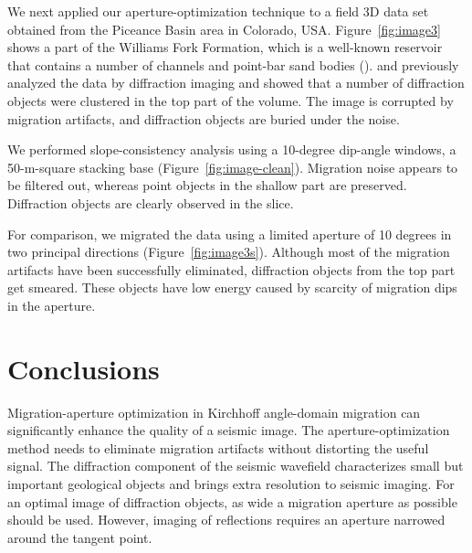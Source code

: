 We next applied our aperture-optimization technique to a field 3D data set obtained from the Piceance Basin area in Colorado, USA.
Figure~\ref{fig:image3} shows a part of the Williams Fork Formation, which is a well-known reservoir that
contains a number of channels and point-bar sand bodies (\citealp{pranter07}). \cite{will} and \cite{klokov12} previously analyzed
the data by diffraction imaging and showed that a number of diffraction objects were clustered in the top part of the volume.
The image is corrupted by migration artifacts, and diffraction objects are buried under the noise.

We performed slope-consistency analysis using a 10-degree dip-angle windows, a 50-m-square stacking base (Figure~\ref{fig:image-clean}). 
Migration noise appears to be filtered out, whereas point objects in the shallow part are preserved. Diffraction objects are clearly observed
in the slice. 

For comparison, we migrated the data using a limited aperture of 10 degrees in two principal directions (Figure~\ref{fig:image3s}).
Although most of the migration artifacts have been successfully eliminated, diffraction objects from the top part get smeared. 
These objects have low energy caused by scarcity of migration dips in the aperture.


\section {Conclusions}

Migration-aperture optimization in Kirchhoff angle-domain migration can significantly enhance
the quality of a seismic image. The aperture-optimization
method needs to eliminate migration artifacts without distorting the useful signal. The diffraction component of the seismic wavefield
characterizes small but important geological objects and brings extra resolution to seismic imaging. For an optimal image of diffraction
objects, as wide a migration aperture as possible should be used. However, imaging of reflections requires an aperture narrowed
around the tangent point. 

